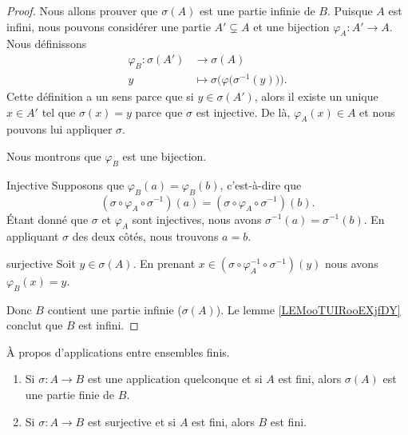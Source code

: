 \begin{proof}
    Nous allons prouver que \( \sigma(A)\) est une partie infinie de \( B\). Puisque \( A\) est infini, nous pouvons considérer une partie \( A'\subsetneq A\) et une bijection \( \varphi_A\colon A'\to A\). Nous définissons
    \begin{equation}
        \begin{aligned}
            \varphi_B\colon \sigma(A')&\to \sigma(A) \\
            y&\mapsto \sigma\Big( \varphi\big( \sigma^{-1}(y) \big)  \Big). 
        \end{aligned}
    \end{equation}
    Cette définition a un sens parce que si \( y\in \sigma(A')\), alors il existe un unique \( x\in A'\) tel que \( \sigma(x)=y\) parce que \( \sigma\) est injective. De là, \( \varphi_A(x)\in A\) et nous pouvons lui appliquer \( \sigma\).

    Nous montrons que \( \varphi_B\) est une bijection.
    \begin{subproof}
    \item[Injective]
        Supposons que \( \varphi_B(a)=\varphi_B(b)\), c'est-à-dire que 
        \begin{equation}
            (\sigma\circ\varphi_A\circ\sigma^{-1})(a)=(\sigma\circ\varphi_A\circ\sigma^{-1})(b).
        \end{equation}
        Étant donné que \( \sigma\) et \( \varphi_A\) sont injectives, nous avons \( \sigma^{-1}(a)=\sigma^{-1}(b)\). En appliquant \( \sigma\) des deux côtés, nous trouvons \( a=b\).
    \item[surjective]
        Soit \( y\in \sigma(A)\). En prenant \( x\in(\sigma\circ\varphi_A^{-1}\circ\sigma^{-1})(y)\) nous avons \( \varphi_B(x)=y\). 
    \end{subproof}
    Donc \( B\) contient une partie infinie (\( \sigma(A)\)). Le lemme \ref{LEMooTUIRooEXjfDY} conclut que \( B\) est infini.
\end{proof}

\begin{lemma}       \label{LEMooPGPVooZzlFvf}
    À propos d'applications entre ensembles finis.
    \begin{enumerate}
        \item       \label{ITEMooNCCUooBGrtdn}
            Si \( \sigma\colon A\to B\) est une application quelconque et si \( A\) est fini, alors \( \sigma(A)\) est une partie finie de \( B\).
        \item       \label{ITEMooKQMFooSzmXrd}
            Si \( \sigma\colon A\to B\) est surjective et si \( A\) est fini, alors \( B\) est fini.
    \end{enumerate}
\end{lemma}

